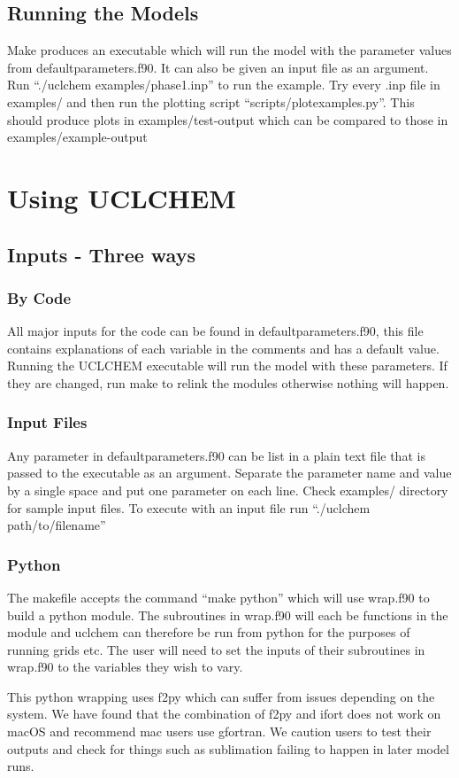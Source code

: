 \documentclass{llncs}
\begin{document}
\subsection{Running the Models}
Make produces an executable which will run the model with the parameter values from defaultparameters.f90. It can also be given an input file as an argument. Run ``./uclchem examples/phase1.inp'' to run the example. Try every .inp file in examples/ and then run the plotting script ``scripts/plotexamples.py''. This should produce plots in examples/test-output which can be compared to those in examples/example-output
%
%
\section{Using UCLCHEM}
\subsection{Inputs - Three ways}
\subsubsection{By Code}
All major inputs for the code can be found in defaultparameters.f90, this file contains explanations of each variable in the comments and has a default value. Running the UCLCHEM executable will run the model with these parameters. If they are changed, run make to relink the modules otherwise nothing will happen.
%
\subsubsection{Input Files}
Any parameter in defaultparameters.f90 can be list in a plain text file that is passed to the executable as an argument. Separate the parameter name and value by a single space and put one parameter on each line. Check examples/ directory for sample input files. To execute with an input file run ``./uclchem path/to/filename''
%
\subsubsection{Python}
The makefile accepts the command ``make python'' which will use wrap.f90 to build a python module. The subroutines in wrap.f90 will each be functions in the module and uclchem can therefore be run from python for the purposes of running grids etc. The user will need to set the inputs of their subroutines in wrap.f90 to the variables they wish to vary.\par
%
This python wrapping uses f2py which can suffer from issues depending on the system. We have found that the combination of f2py and ifort does not work on macOS and recommend mac users use gfortran. We caution users to test their outputs and check for things such as sublimation failing to happen in later model runs. 
%
\end{document}
